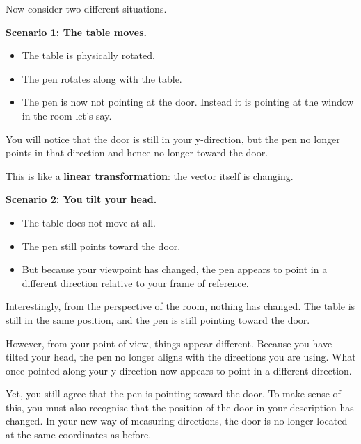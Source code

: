 \documentclass[11pt,openany]{book}
\theoremstyle{definition}
\begin{document}
\medskip

Now consider two different situations.

\medskip

\textbf{Scenario 1: The table moves.}

\begin{itemize}
  \item The table is physically rotated.
  \item The pen rotates along with the table.
  \item The pen is now not pointing at the door. Instead it is pointing at the window in the room let's say.
\end{itemize}

You will notice that the door is still in your y-direction, but the pen no longer points in that direction and hence no longer toward the door.

This is like a \textbf{linear transformation}: the vector itself is changing.

\medskip

\textbf{Scenario 2: You tilt your head.}

\begin{itemize}
  \item The table does not move at all.
  \item The pen still points toward the door.
  \item But because your viewpoint has changed, the pen appears to point in a different direction relative to your frame of reference.
\end{itemize}

Interestingly, from the perspective of the room, nothing has changed. 
The table is still in the same position, and the pen is still pointing toward the door.

\medskip

However, from your point of view, things appear different. 
Because you have tilted your head, the pen no longer aligns with the directions you are using. 
What once pointed along your y-direction now appears to point in a different direction.

\medskip

Yet, you still agree that the pen is pointing toward the door. 
To make sense of this, you must also recognise that the position of the door in your description has changed. 
In your new way of measuring directions, the door is no longer located at the same coordinates as before.

\medskip
\end{document}
